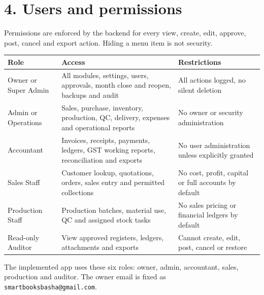 \documentclass[11pt]{article}
\begin{document}
\section{4. Users and permissions}
Permissions are enforced by the backend for every view, create, edit, approve, post, cancel and export action. Hiding a menu item is not security.
\begin{center}\small\begin{tabularx}{\linewidth}{|*{3}{>{\raggedright\arraybackslash}X|}}
\hline
\textbf{Role} & \textbf{Access} & \textbf{Restrictions} \\
\hline
Owner or Super Admin & All modules, settings, users, approvals, month close and reopen, backups and audit & All actions logged, no silent deletion \\
\hline
Admin or Operations & Sales, purchase, inventory, production, QC, delivery, expenses and operational reports & No owner or security administration \\
\hline
Accountant & Invoices, receipts, payments, ledgers, GST working reports, reconciliation and exports & No user administration unless explicitly granted \\
\hline
Sales Staff & Customer lookup, quotations, orders, sales entry and permitted collections & No cost, profit, capital or full accounts by default \\
\hline
Production Staff & Production batches, material use, QC and assigned stock tasks & No sales pricing or financial ledgers by default \\
\hline
Read-only Auditor & View approved registers, ledgers, attachments and exports & Cannot create, edit, post, cancel or restore \\
\hline
\end{tabularx}\end{center}
The implemented app uses these six roles: owner, admin, accountant, sales, production and auditor. The owner email is fixed as \texttt{smartbooksbasha@gmail.com}.
\clearpage
\end{document}
